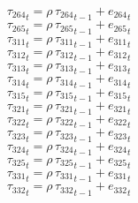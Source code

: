 \begin{dmath}
{{\tau_{264}}}_{t}={{\rho}}\, {{\tau_{264}}}_{t-1}+{{e_{264}}}_{t}
\end{dmath}
\begin{dmath}
{{\tau_{265}}}_{t}={{\rho}}\, {{\tau_{265}}}_{t-1}+{{e_{265}}}_{t}
\end{dmath}
\begin{dmath}
{{\tau_{311}}}_{t}={{\rho}}\, {{\tau_{311}}}_{t-1}+{{e_{311}}}_{t}
\end{dmath}
\begin{dmath}
{{\tau_{312}}}_{t}={{\rho}}\, {{\tau_{312}}}_{t-1}+{{e_{312}}}_{t}
\end{dmath}
\begin{dmath}
{{\tau_{313}}}_{t}={{\rho}}\, {{\tau_{313}}}_{t-1}+{{e_{313}}}_{t}
\end{dmath}
\begin{dmath}
{{\tau_{314}}}_{t}={{\rho}}\, {{\tau_{314}}}_{t-1}+{{e_{314}}}_{t}
\end{dmath}
\begin{dmath}
{{\tau_{315}}}_{t}={{\rho}}\, {{\tau_{315}}}_{t-1}+{{e_{315}}}_{t}
\end{dmath}
\begin{dmath}
{{\tau_{321}}}_{t}={{\rho}}\, {{\tau_{321}}}_{t-1}+{{e_{321}}}_{t}
\end{dmath}
\begin{dmath}
{{\tau_{322}}}_{t}={{\rho}}\, {{\tau_{322}}}_{t-1}+{{e_{322}}}_{t}
\end{dmath}
\begin{dmath}
{{\tau_{323}}}_{t}={{\rho}}\, {{\tau_{323}}}_{t-1}+{{e_{323}}}_{t}
\end{dmath}
\begin{dmath}
{{\tau_{324}}}_{t}={{\rho}}\, {{\tau_{324}}}_{t-1}+{{e_{324}}}_{t}
\end{dmath}
\begin{dmath}
{{\tau_{325}}}_{t}={{\rho}}\, {{\tau_{325}}}_{t-1}+{{e_{325}}}_{t}
\end{dmath}
\begin{dmath}
{{\tau_{331}}}_{t}={{\rho}}\, {{\tau_{331}}}_{t-1}+{{e_{331}}}_{t}
\end{dmath}
\begin{dmath}
{{\tau_{332}}}_{t}={{\rho}}\, {{\tau_{332}}}_{t-1}+{{e_{332}}}_{t}
\end{dmath}
